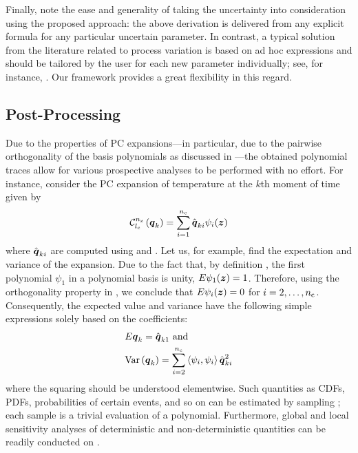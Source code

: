 Finally, note the ease and generality of taking the uncertainty into
consideration using the proposed approach: the above derivation is delivered
from any explicit formula for any particular uncertain parameter. In contrast, a
typical solution from the literature related to process variation is based on ad
hoc expressions and should be tailored by the user for each new parameter
individually; see, for instance, \cite{huang2009a, bhardwaj2008, ghanta2006}.
Our framework provides a great flexibility in this regard.

\subsection{Post-Processing}

Due to the properties of PC expansions---in particular, due to the pairwise
orthogonality of the basis polynomials as discussed in
---the obtained polynomial traces allow for various
prospective analyses to be performed with no effort. For instance, consider the
PC expansion of temperature at the $k$th moment of time given by
\begin{equation} \elab{pc-k}
  \chaos{\nz}{\lc}{\vq_k} = \sum_{i = 1}^{\nc} \hat{\vq}_{ki} \psi_i(\vz)
\end{equation}
where $\hat{\boldsymbol{q}}_{ki}$ are computed using  and
. Let us, for example, find the expectation and variance of
the expansion. Due to the fact that, by definition \cite{xiu2010}, the first
polynomial $\psi_1$ in a polynomial basis is unity, $\expectation{\psi_1(\vz)} =
1$. Therefore, using the orthogonality property in , we
conclude that $\expectation{\psi_i(\vz)} = 0$ for $i = 2, \dots, {n_\mathrm{c}}$.
Consequently, the expected value and variance have the following simple
expressions solely based on the coefficients:
\begin{equation} \elab{pc-moments}
  \begin{split}
    & \expectation{\vq_k} = \hat{\vq}_{k1} \text{ and} \\
    & \variance{\vq_k} = \sum_{i = 2}^{\nc} \innerproduct{\psi_i}{\psi_i} \hat{\vq}_{ki}^2
  \end{split}
\end{equation}
where the squaring should be understood elementwise. Such quantities as CDFs,
PDFs, probabilities of certain events, and so on can be estimated by sampling
; each sample is a trivial evaluation of a polynomial. Furthermore,
global and local sensitivity analyses of deterministic and non-deterministic
quantities can be readily conducted on .

